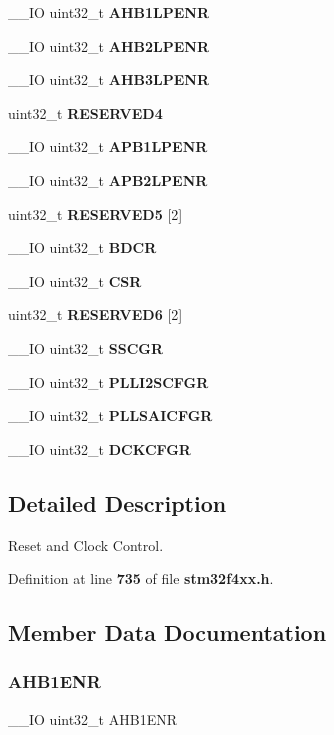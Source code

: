 \begin{DoxyCompactItemize}
\item 
\+\_\+\+\_\+\+IO uint32\+\_\+t \textbf{ A\+H\+B1\+L\+P\+E\+NR}
\item 
\+\_\+\+\_\+\+IO uint32\+\_\+t \textbf{ A\+H\+B2\+L\+P\+E\+NR}
\item 
\+\_\+\+\_\+\+IO uint32\+\_\+t \textbf{ A\+H\+B3\+L\+P\+E\+NR}
\item 
uint32\+\_\+t \textbf{ R\+E\+S\+E\+R\+V\+E\+D4}
\item 
\+\_\+\+\_\+\+IO uint32\+\_\+t \textbf{ A\+P\+B1\+L\+P\+E\+NR}
\item 
\+\_\+\+\_\+\+IO uint32\+\_\+t \textbf{ A\+P\+B2\+L\+P\+E\+NR}
\item 
uint32\+\_\+t \textbf{ R\+E\+S\+E\+R\+V\+E\+D5} [2]
\item 
\+\_\+\+\_\+\+IO uint32\+\_\+t \textbf{ B\+D\+CR}
\item 
\+\_\+\+\_\+\+IO uint32\+\_\+t \textbf{ C\+SR}
\item 
uint32\+\_\+t \textbf{ R\+E\+S\+E\+R\+V\+E\+D6} [2]
\item 
\+\_\+\+\_\+\+IO uint32\+\_\+t \textbf{ S\+S\+C\+GR}
\item 
\+\_\+\+\_\+\+IO uint32\+\_\+t \textbf{ P\+L\+L\+I2\+S\+C\+F\+GR}
\item 
\+\_\+\+\_\+\+IO uint32\+\_\+t \textbf{ P\+L\+L\+S\+A\+I\+C\+F\+GR}
\item 
\+\_\+\+\_\+\+IO uint32\+\_\+t \textbf{ D\+C\+K\+C\+F\+GR}
\end{DoxyCompactItemize}


\subsection{Detailed Description}
Reset and Clock Control. 

Definition at line \textbf{ 735} of file \textbf{ stm32f4xx.\+h}.



\subsection{Member Data Documentation}
\mbox{\label{structRCC__TypeDef_a1e9c75b06c99d0611535f38c7b4aa845}} 
\subsubsection{A\+H\+B1\+E\+NR}
{\footnotesize\ttfamily \+\_\+\+\_\+\+IO uint32\+\_\+t A\+H\+B1\+E\+NR}

